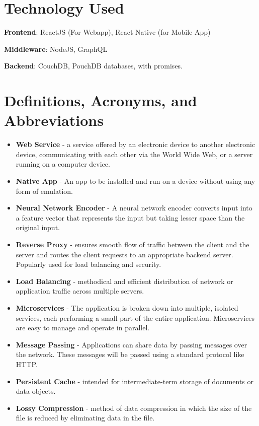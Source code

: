 \section{Technology Used}

\textbf{Frontend}: ReactJS (For Webapp), React Native (for Mobile App)

\textbf{Middleware}: NodeJS, GraphQL

\textbf{Backend}: CouchDB, PouchDB databases, with promises.

\section{Definitions, Acronyms, and Abbreviations}

\begin{itemize}
    \item \textbf{Web Service} - a service offered by an electronic device to another electronic device, 
    communicating with each other via the World Wide Web, or a server running on a computer device.
    \item \textbf{Native App} - An app to be installed and run on a device without using any form of emulation.
    \item \textbf{Neural Network Encoder} - A neural network encoder converts input into a feature vector that represents the input but taking lesser space than the original input.
    \item \textbf{Reverse Proxy} - ensures smooth flow of traffic between the client and the server and routes the client requests to an appropriate backend server. Popularly used for load balancing and security.
    \item \textbf{Load Balancing} - methodical and efficient distribution of network or application traffic across multiple servers.
    \item \textbf{Microservices} - The application is broken down into multiple, isolated services, each performing a small part of the entire application. Microservices are easy to manage and operate in parallel.
    \item \textbf{Message Passing} - Applications can share data by passing messages over the network. 
    These messages will be passed using a standard protocol like HTTP.
    \item \textbf{Persistent Cache} - intended for intermediate-term storage of documents or data objects.
    \item \textbf{Lossy Compression} - method of data compression in which the size of the file is reduced by eliminating data in the file.

\end{itemize}
